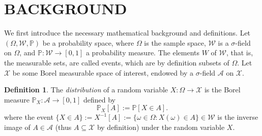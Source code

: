 \documentclass[twoside]{article} \usepackage{aistats2017}
\theoremstyle{definition}
\newtheorem{definition}{Definition}[section]
\theoremstyle{theorem}
\newcommand{\rv}[1]{{#1}}
\begin{document}
% 
% 
	
\section{BACKGROUND}
\label{sec:background}
	
%
%
	We first introduce the necessary mathematical background and definitions. Let $(\Omega, \mathcal{W}, \mathbb{P})$ be a probability space, where $\Omega$ is the sample space, $\mathcal{W}$ is a $\sigma$-field on $\Omega$, and $\mathbb{P} : \mathcal{W} \to [0, 1]$ a probability measure. The elements $W$ of $\mathcal{W}$, that is, the measurable sets, are called events, which are by definition subsets of $\Omega$. Let $\mathcal{X}$ be some Borel measurable space of interest, endowed by a $\sigma$-field $\mathcal{A}$ on $\mathcal{X}$.
%
%
	
	\begin{definition} \label{def:distribution}
		\citep{bauer1981probability}
		The \textit{distribution} of a random variable $\rv{X} : \Omega \to \mathcal{X}$ is the Borel measure $\mathbb{P}_{\rv{X}} : \mathcal{A} \to [0, 1]$ defined by
		\begin{equation}
			\mathbb{P}_{\rv{X}}[A] := \mathbb{P}[\rv{X} \in A].
		\label{eq:distribution}
		\end{equation}
		where the event $\{\rv{X} \in A\} := \rv{X}^{-1}[A] := \{\omega \in \Omega : \rv{X}(\omega) \in A\} \in \mathcal{W}$ is the inverse image of $A \in \mathcal{A}$ (thus $A \subseteq \mathcal{X}$ by definition) under the random variable $\rv{X}$.
	\end{definition}
	
\end{document}
